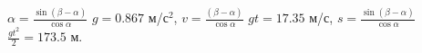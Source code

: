 $\alpha=\frac{\sin\left(\beta-\alpha\right)}{\cos\alpha}$
$g=0.867$ м/с$^2$, $v=\frac{\left(\beta-\alpha\right)}{\cos\alpha}$
$gt=17.35$ м/с, $s=\frac{\sin\left(\beta-\alpha\right)}{\cos\alpha}$
$\frac{gt^2}{2}=173.5$ м.
